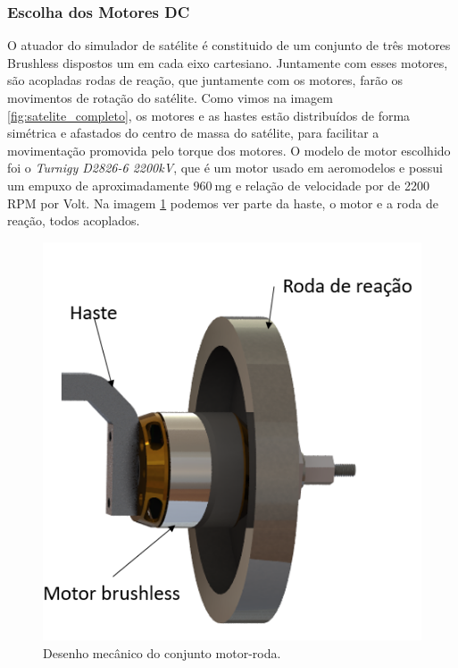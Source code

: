 
\subsubsection{Escolha dos Motores DC}

O atuador do simulador de satélite é constituido de um conjunto de três motores Brushless dispostos um em cada eixo cartesiano. Juntamente com esses motores, são acopladas rodas de reação, que juntamente com os motores, farão os movimentos de rotação do satélite. Como vimos na imagem \ref{fig:satelite_completo}, os motores e as hastes estão distribuídos de forma simétrica e afastados do centro de massa do satélite, para facilitar a movimentação promovida pelo torque dos motores. O modelo de motor escolhido foi o \textit{Turnigy D2826-6 2200kV}, que é um motor usado em aeromodelos e possui um empuxo de aproximadamente $\SI{960}{\milli\gram}$ e relação de velocidade por de 2200 RPM por Volt. Na imagem \ref{fig:motor_roda_desenho} podemos ver parte da haste, o motor e a roda de reação, todos acoplados. 

\begin{figure}[H]
  \caption{Desenho mecânico do conjunto motor-roda.}
  \begin{center}
      \includegraphics[scale=.45]{metodologia/img/motor_roda_desenho}
  \end{center}
  \label{fig:motor_roda_desenho}
\end{figure}

